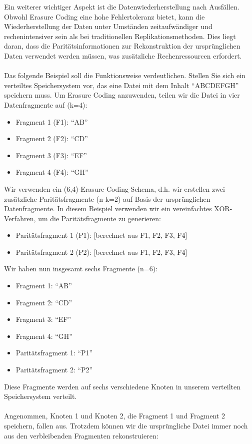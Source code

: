 \documentclass[../vs-script-first-v01.tex]{subfiles}
\begin{document}
Ein weiterer wichtiger Aspekt ist die Datenwiederherstellung nach Ausfällen. Obwohl Erasure Coding eine hohe Fehlertoleranz bietet, kann die Wiederherstellung der Daten unter Umständen zeitaufwändiger und rechenintensiver sein als bei traditionellen Replikationsmethoden. Dies liegt daran, dass die Paritätsinformationen zur Rekonstruktion der ursprünglichen Daten verwendet werden müssen, was zusätzliche Rechenressourcen erfordert.
\\\\
Das folgende Beispiel soll die Funktionsweise verdeutlichen. Stellen Sie sich ein verteiltes Speichersystem vor, das eine Datei mit dem Inhalt \enquote{ABCDEFGH} speichern muss. Um Erasure Coding anzuwenden, teilen wir die Datei in vier Datenfragmente auf (k=4):
\begin{itemize}
\item Fragment 1 (F1): \enquote{AB}
\item Fragment 2 (F2): \enquote{CD}
\item Fragment 3 (F3): \enquote{EF}
\item Fragment 4 (F4): \enquote{GH}
\end{itemize}
Wir verwenden ein (6,4)-Erasure-Coding-Schema, d.h. wir erstellen zwei zusätzliche Paritätsfragmente (n-k=2) auf Basis der ursprünglichen Datenfragmente. In diesem Beispiel verwenden wir ein vereinfachtes XOR-Verfahren, um die Paritätsfragmente zu generieren:
\begin{itemize}
\item Paritätsfragment 1 (P1): [berechnet aus F1, F2, F3, F4]
\item Paritätsfragment 2 (P2): [berechnet aus F1, F2, F3, F4]
\end{itemize}
Wir haben nun insgesamt sechs Fragmente (n=6):
\begin{itemize}
\item Fragment 1: \enquote{AB}
\item Fragment 2: \enquote{CD}
\item Fragment 3: \enquote{EF}
\item Fragment 4: \enquote{GH}
\item Paritätsfragment 1: \enquote{P1}
\item Paritätsfragment 2: \enquote{P2}
\end{itemize}  
Diese Fragmente werden auf sechs verschiedene Knoten in unserem verteilten Speichersystem verteilt.
\\\\
Angenommen, Knoten 1 und Knoten 2, die Fragment 1 und Fragment 2 speichern, fallen aus. Trotzdem können wir die ursprüngliche Datei immer noch aus den verbleibenden Fragmenten rekonstruieren:
\end{document}

